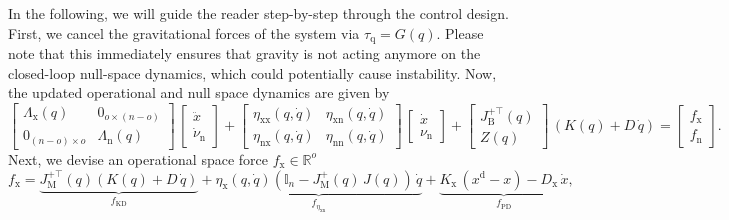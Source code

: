 In the following, we will guide the reader step-by-step through the control design.
First, we cancel the gravitational forces of the system via $\tau_\mathrm{q} = G(q)$. Please note that this immediately ensures that gravity is not acting anymore on the closed-loop null-space dynamics, which could potentially cause instability.
Now, the updated operational and null space dynamics are given by
\begin{equation}
    \begin{bmatrix}
        \Lambda_\mathrm{x}(q) & 0_{o \times (n-o)}\\
        0_{(n-o) \times o} & \Lambda_\mathrm{n}(q)
    \end{bmatrix} \, \begin{bmatrix}
        \ddot{x}\\
        \dot{\nu}_\mathrm{n}
    \end{bmatrix} + \begin{bmatrix}
        \eta_\mathrm{xx}(q,\dot{q}) & \eta_\mathrm{xn}(q,\dot{q})\\
        \eta_\mathrm{nx}(q,\dot{q}) & \eta_\mathrm{nn}(q,\dot{q})
    \end{bmatrix} \, \begin{bmatrix}
        \dot{x}\\ \nu_\mathrm{n}
    \end{bmatrix} + \begin{bmatrix}
        J_\mathrm{B}^{+\top}(q)\\
        Z(q)
    \end{bmatrix} \, \left ( K(q) + D \, \dot{q} \right ) = \begin{bmatrix}
        f_\mathrm{x}\\ f_\mathrm{n}
    \end{bmatrix}.
\end{equation}
Next, we devise an operational space force $f_\mathrm{x} \in \mathbb{R}^o$
\begin{equation}
    f_\mathrm{x} = \underbrace{J_\mathrm{M}^{+\top}(q) \left ( K(q) + D \, \dot{q} \right )}_{f_\mathrm{KD}}
    + \underbrace{\eta_\mathrm{x}(q,\dot{q}) \left ( \mathbb{I}_n - J_\mathrm{M}^{+}(q) \, J(q)  \right ) \, \dot{q}}_{f_{\eta_\mathrm{xn}}}
    + \underbrace{K_\mathrm{x} \, (x^\mathrm{d} - x) - D_\mathrm{x} \, \dot{x}}_{f_\mathrm{PD}},
\end{equation}
